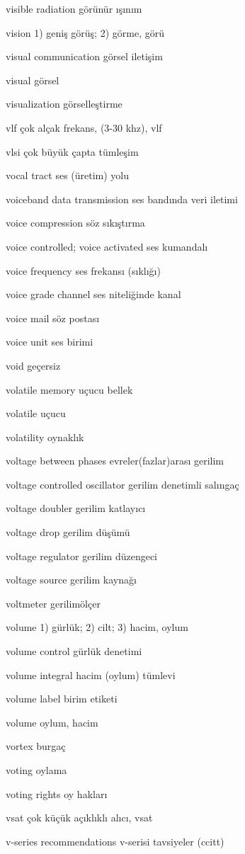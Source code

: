 \documentclass[12pt,fleqn]{article}\usepackage{../../common}
\begin{document}
visible radiation görünür ışınım

vision 1) geniş görüş; 2) görme, görü

visual communication görsel iletişim

visual görsel

visualization görselleştirme

vlf çok alçak frekans, (3-30 khz), vlf

vlsi çok büyük çapta tümleşim

vocal tract ses (üretim) yolu

voiceband data transmission ses bandında veri iletimi

voice compression söz sıkıştırma

voice controlled; voice activated ses kumandalı

voice frequency ses frekansı (sıklığı)

voice grade channel ses niteliğinde kanal

voice mail söz postası

voice unit ses birimi

void geçersiz

volatile memory uçucu bellek

volatile uçucu

volatility oynaklık

voltage between phases evreler(fazlar)arası gerilim

voltage controlled oscillator gerilim denetimli salıngaç

voltage doubler gerilim katlayıcı

voltage drop gerilim düşümü

voltage regulator gerilim düzengeci

voltage source gerilim kaynağı

voltmeter gerilimölçer

volume 1) gürlük; 2) cilt; 3) hacim, oylum

volume control gürlük denetimi

volume integral hacim (oylum) tümlevi

volume label birim etiketi

volume oylum, hacim

vortex burgaç

voting oylama

voting rights oy hakları

vsat çok küçük açıklıklı alıcı, vsat

v-series recommendations v-serisi tavsiyeler (ccitt)
\end{document}
